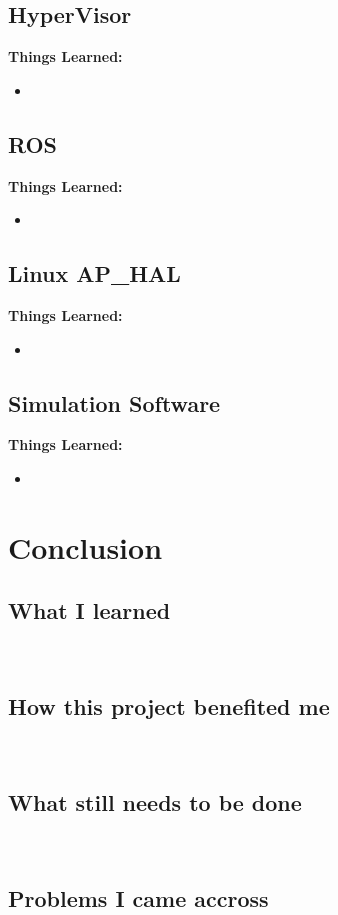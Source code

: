 \documentclass[letterpaper,10pt,notitlepage,fleqn]{article}
\begin{document}
\subsection{HyperVisor}
\indent
\textbf{Things Learned:}
    \begin{itemize} 
        \item
    \end{itemize}

\subsection{ROS}
\indent
\textbf{Things Learned:}
\begin{itemize} 
        \item
    \end{itemize}

\subsection{Linux AP\_HAL}
\indent
\textbf{Things Learned:}
\begin{itemize} 
        \item
    \end{itemize}

\subsection{Simulation Software}
\indent
\textbf{Things Learned:}
\begin{itemize} 
        \item
    \end{itemize}

\section{Conclusion}
\subsection{What I learned}
\indent
\\
\subsection{How this project benefited me}
\indent
\\
\subsection{What still needs to be done}
\indent
\\ 
\subsection{Problems I came accross}
\indent
\end{document}
